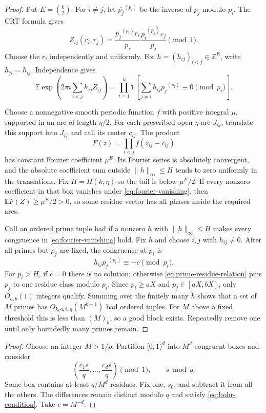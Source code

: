 \documentclass[11pt,a4paper]{article}
\theoremstyle{plain}
\theoremstyle{definition}
\theoremstyle{remark}
\newcommand{\E}{\mathbb E}
\begin{document}
\label{pf:generic}
\lemgeneric*
\begin{proof}
Put $E=\binom{k}{2}$. For $i\ne j$, let $\overline{p_j}^{(p_i)}$ be the inverse of $p_j$ modulo $p_i$. The CRT formula gives
\[
 Z_{ij}(r_i,r_j)
 =\frac{\overline{p_j}^{(p_i)}r_i}{p_i}
  \frac{\overline{p_i}^{(p_j)}r_j}{p_j}\pmod1.
\tag{A.2}
\]
Choose the $r_i$ independently and uniformly. For $h=(h_{ij})_{i<j}\in\mathbb Z^E$, write $h_{ji}=h_{ij}$. Independence gives
\[
 \E\exp\left(2\pi i\sum_{i<j}h_{ij}Z_{ij}\right)
 =\prod_{i=1}^k
 \mathbf1\left[
 \sum_{j\ne i}h_{ij}\overline{p_j}^{(p_i)}
 \equiv0\pmod{p_i}\right].
\tag{A.3}\label{eq:fourier-vanishing}
\]

Choose a nonnegative smooth periodic function $f$ with positive integral $\mu$, supported in an arc of length $\eta/2$. For each prescribed open $\eta$-arc $J_{ij}$, translate this support into $J_{ij}$ and call its center $c_{ij}$. The product
\[
 F(z)=\prod_{i<j}f(z_{ij}-c_{ij})
\]
has constant Fourier coefficient $\mu^E$. Its Fourier series is absolutely convergent, and the absolute coefficient sum outside $\|h\|_\infty\le H$ tends to zero uniformly in the translations. Fix $H=H(k,\eta)$ so the tail is below $\mu^E/2$. If every nonzero coefficient in that box vanishes under \eqref{eq:fourier-vanishing}, then $\E F(Z)\ge\mu^E/2>0$, so some residue vector has all phases inside the required arcs.

Call an ordered prime tuple bad if a nonzero $h$ with $\|h\|_\infty\le H$ makes every congruence in \eqref{eq:fourier-vanishing} hold. Fix $h$ and choose $i,j$ with $h_{ij}\ne0$. After all primes but $p_j$ are fixed, the congruence at $p_i$ is
\[
 h_{ij}\overline{p_j}^{(p_i)}\equiv-c\pmod{p_i}.
\tag{A.4}\label{eq:prime-residue-relation}
\]
For $p_i>H$, if $c=0$ there is no solution; otherwise \eqref{eq:prime-residue-relation} pins $p_j$ to one residue class modulo $p_i$. Since $p_i\ge aX$ and $p_j\in[aX,bX]$, only $O_{a,b}(1)$ integers qualify. Summing over the finitely many $h$ shows that a set of $M$ primes has $O_{k,a,b,\eta}(M^{k-1})$ bad ordered tuples. For $M$ above a fixed threshold this is less than $(M)_k$, so a good block exists. Repeatedly remove one until only boundedly many primes remain.
\end{proof}

\label{pf:bohr}
\lembohr*
\begin{proof}
Choose an integer $M>1/\rho$. Partition $[0,1)^d$ into $M^d$ congruent boxes and consider
\[
 \left(\frac{c_1s}{q},\ldots,\frac{c_ds}{q}\right)\pmod1,
 \qquad s\bmod q.
\]
Some box contains at least $q/M^d$ residues. Fix one, $s_0$, and subtract it from all the others. The differences remain distinct modulo $q$ and satisfy \eqref{eq:bohr-condition}. Take $c=M^{-d}$.
\end{proof}
\end{document}
